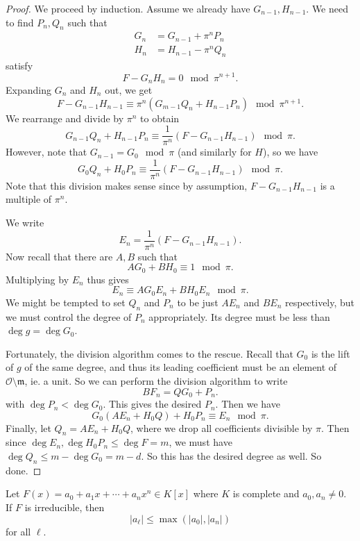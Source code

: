 \documentclass[a4paper]{article}
\begin{document}
\begin{proof}
  We proceed by induction. Assume we already have $G_{n - 1}, H_{n - 1}$. We need to find $P_n, Q_n$ such that
  \begin{align*}
    G_n &= G_{n - 1} + \pi^n P_n\\
    H_n &= H_{n - 1} - \pi^n Q_n
  \end{align*}
  satisfy
  \[
    F - G_n H_n = 0\mod \pi^{n + 1}.
  \]
  Expanding $G_n$ and $H_n$ out, we get
  \[
    F - G_{n - 1}H_{n - 1} \equiv \pi^n (G_{m - 1} Q_n + H_{n - 1} P_n) \mod \pi^{n + 1}.
  \]
  We rearrange and divide by $\pi^n$ to obtain
  \[
    G_{n - 1} Q_n + H_{n - 1} P_n \equiv \frac{1}{\pi^n}(F - G_{n - 1}H_{n - 1}) \mod \pi.
  \]
  However, note that $G_{n - 1} = G_0 \mod \pi$ (and similarly for $H$), so we have
  \[
    G_0 Q_n + H_0 P_n \equiv \frac{1}{\pi^n}(F - G_{n - 1}H_{n - 1}) \mod \pi.
  \]
  Note that this division makes sense since by assumption, $F - G_{n - 1}H_{n - 1}$ is a multiple of $\pi^n$.

  We write
  \[
    E_n = \frac{1}{\pi^n}(F - G_{n - 1}H_{n - 1}).
  \]
  Now recall that there are $A, B$ such that
  \[
    AG_0 + B H_0 \equiv 1\mod \pi.
  \]
  Multiplying by $E_n$ thus gives
  \[
    E_n \equiv AG_0 E_n + B H_0 E_n\mod \pi.
  \]
  We might be tempted to set $Q_n$ and $P_n$ to be just $AE_n$ and $BE_n$ respectively, but we must control the degree of $P_n$ appropriately. Its degree must be less than $\deg g = \deg G_0$.

  Fortunately, the division algorithm comes to the rescue. Recall that $G_0$ is the lift of $g$ of the same degree, and thus its leading coefficient must be an element of $\mathcal{O} \setminus \mathfrak{m}$, ie. a unit. So we can perform the division algorithm to write
  \[
    B F_n = Q G_0 + P_n.
  \]
  with $\deg P_n < \deg G_0$. This gives the desired $P_n$. Then we have
  \[
    G_0 (A E_n + H_0 Q) + H_0 P_n \equiv E_n \mod \pi.
  \]
  Finally, let $Q_n = A E_n + H_0 Q$, where we drop all coefficients divisible by $\pi$. Then since $\deg E_n, \deg H_0 P_n \leq \deg F = m$, we must have $\deg Q_n \leq m - \deg G_0 = m - d$. So this has the desired degree as well. So done.
\end{proof}

\begin{cor}
  Let $F(x) = a_0 + a_1 x + \cdots + a_n x^n \in K[x]$ where $K$ is complete and $a_0, a_n \not= 0$. If $F$ is irreducible, then
  \[
    |a_\ell| \leq \max(|a_0|, |a_n|)
  \]
  for all $\ell$.
\end{cor}
\end{document}
